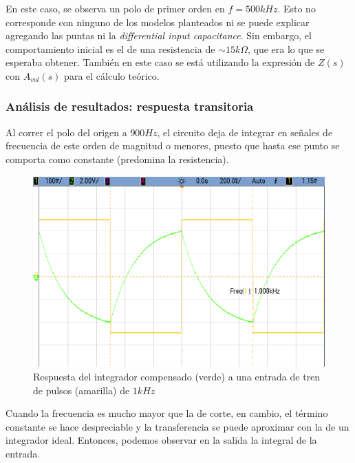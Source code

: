 \documentclass[../../main.tex]{subfiles}
\begin{document}
En este caso, se observa un polo de primer orden en $f=500kHz$.  Esto no corresponde con ninguno de los modelos planteados ni se puede explicar agregando las puntas ni la \textit{differential input capacitance}. Sin embargo, el comportamiento inicial es el de una resistencia de $\sim 15k\Omega$, que era lo que se esperaba obtener. Tambi\'en en este caso se est\'a utilizando la expresi\'on de $Z(s)$ con $A_{vol}(s)$ para el c\'alculo te\'orico.

\subsubsection{An\'alisis de resultados: respuesta transitoria}

Al correr el polo del origen a $900Hz$, el circuito deja de integrar en se\~nales de frecuencia de este orden de magnitud o menores, puesto que hasta ese punto se comporta como constante (predomina la resistencia).
\begin{figure}  [H]
	\centering
	\label{fig:i-1k}
	\includegraphics[scale=0.4]{fotos/tc_tp2_ej4_icomp_1k.png}
	\caption{Respuesta del integrador compensado (verde) a una entrada de tren de pulsos (amarilla) de $1kHz$}
\end{figure}

Cuando la frecuencia es mucho mayor que la de corte, en cambio, el t\'ermino constante se hace despreciable y la transferencia se puede aproximar con la de un integrador ideal. Entonces, podemos observar en la salida la integral de la entrada.
\end{document}
